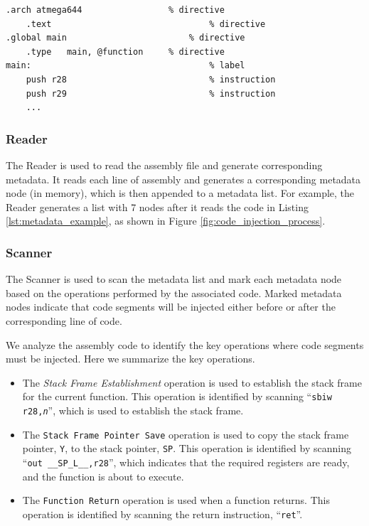 \begin{lstlisting}[float=tb,label=lst:metadata_example,caption=Assembly Code Example]
.arch atmega644					% directive
	.text								% directive
.global	main						% directive
	.type	main, @function		% directive
main:									% label
	push r28							% instruction
	push r29							% instruction
	...
\end{lstlisting}
\vspace{-15pt}
\subsubsection{Reader}
\vspace{-5pt}
The Reader is used to read the assembly file and generate corresponding metadata. It reads each line of assembly and generates a corresponding metadata node (in memory), which is then appended to a metadata list. For example, the Reader generates a list with 7 nodes after it reads the code in Listing \ref{lst:metadata_example}, as shown in Figure \ref{fig:code_injection_process}.
\vspace{-15pt}
\subsubsection{Scanner}\label{sec:scanner}
\vspace{-5pt}
The Scanner is used to scan the metadata list and mark each metadata node based on the operations performed by the associated code. Marked metadata nodes indicate that code segments will be injected either before or after the corresponding line of code.

We analyze the assembly code to identify the key operations where code segments must be injected. Here we summarize the key operations.

\begin{itemize}
\item The \textit{Stack Frame Establishment} operation is used to establish the stack frame for the current function. This operation is identified by scanning ``\texttt{sbiw r28,\textit{n}}'', which is used to establish the stack frame.

\item The \texttt{Stack Frame Pointer Save} operation is used to copy the stack frame pointer, \texttt{Y}, to the stack pointer, \texttt{SP}. This operation is identified by scanning ``\texttt{out \_\_SP\_L\_\_,r28}'', which indicates that the required registers are ready, and the function is about to execute. 

\item The \texttt{Function Return} operation is used when a function returns. This operation is identified by scanning the return instruction, ``\texttt{ret}''.
\end{itemize}

